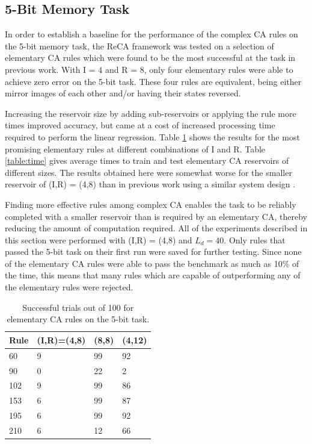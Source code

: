 \documentclass{elsarticle}
\begin{document}
\begin{multicols}{2}
\subsection{5-Bit Memory Task}
In order to establish a baseline for the performance of the complex CA rules on 
    the 5-bit memory task, the ReCA framework was tested on a selection of 
    elementary CA rules which were found to be the most successful at the task 
    in previous work\cite{yilmaz2014reservoir}\cite{bye2016investigation}. With 
    I = 4 and R = 8, only four elementary rules were able to achieve zero error 
    on the 5-bit task. These four rules are equivalent, being either mirror 
    images of each other and/or having their states reversed.\par Increasing 
    the reservoir size by adding sub-reservoirs or applying the rule more times 
    improved accuracy, but came at a cost of increased processing time required 
    to perform the linear regression.  Table \ref{table:elementary} shows the 
    results for the most promising elementary rules at different combinations 
    of I and R.  Table \ref{table:time} gives average times to train and test 
    elementary CA reservoirs of different sizes. The results obtained here were 
    somewhat worse for the smaller reservoir of (I,R) = (4,8) than in previous 
    work using a similar system design  
    \cite{bye2016investigation}\cite{yilmaz2014reservoir}\cite{nichele2017reservoir}.  
    \par Finding more effective rules among complex CA enables the task to be 
    reliably completed with a smaller reservoir than is required by an 
    elementary CA, thereby reducing the amount of computation required. All of 
    the experiments described in this section were performed with (I,R) = (4,8) 
    and $L_{d} = 40$.  Only rules that passed the 5-bit task on their first run 
    were saved for further testing. Since none of the elementary CA rules were 
    able to pass the benchmark as much as 10\% of the time, this means that 
    many rules which are capable of outperforming any of the elementary rules 
    were rejected. 


\begin{table}[H] \centering
\begin{tabular}{|l|l|l|l|}
\hline
\textbf{Rule} & \textbf{(I,R)=(4,8)} & \textbf{(8,8)} & \textbf{(4,12)} \\ 
\hline
60 & 9 & 99 & 92 \\ \hline
90 & 0 & 22 & 2  \\ \hline
102 & 9 & 99 & 86 \\ \hline
153 & 6 & 99 & 87 \\ \hline
195 & 6 & 99 & 92 \\ \hline
210 & 6 & 12 & 66 \\ \hline
\end{tabular}
\caption{Successful trials out of 100 for elementary CA rules on the 5-bit 
    task.}
\label{table:elementary}
\end{table}


\end{multicols}
\end{document}
